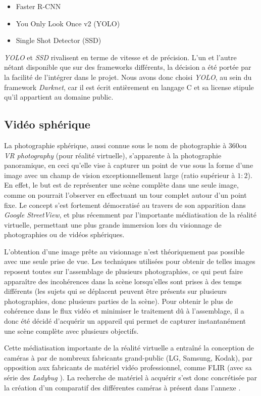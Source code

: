 			\begin{itemize}[noitemsep]
				\item Faster R-CNN\cite{fasterrcnn}
				\item You Only Look Once v2 (YOLO)\cite{yolo}
				\item Single Shot Detector (SSD)\cite{ssd}
			\end{itemize}
			
			\emph{YOLO} et \emph{SSD} rivalisent en terme de vitesse et de précision. L'un et l'autre nétant disponible que sur des frameworks différents, la décision a été portée par la facilité de l'intégrer dans le projet. Nous avons donc choisi \emph{YOLO}, au sein du framework \emph{Darknet}, car il est écrit entièrement en langage C et sa license stipule qu'il appartient au domaine public.
			

		\subsection{Vidéo sphérique}
			La photographie sphérique, aussi connue sous le nom de photographie à 360\degre ou \emph{VR photography} (pour réalité virtuelle), s'apparente à la photographie panoramique, en ceci qu'elle vise à capturer un point de vue sous la forme d'une image avec un champ de vision exceptionnellement large (ratio supérieur à $1:2$)\cite{fnumpano}. En effet, le but est de représenter une scène complète dans une seule image, comme on pourrait l'observer en effectuant un tour complet autour d'un point fixe. Le concept s'est fortement démocratisé au travers de son apparition dans \emph{Google StreetView}, et plus récemment par l'importante médiatisation de la réalité virtuelle, permettant une plus grande immersion lors du visionnage de photographies ou de vidéos sphériques.
			\par
			L'obtention d'une image prête au visionnage n'est théoriquement pas possible avec une seule prise de vue. Les techniques utilisées pour obtenir de telles images reposent toutes sur l'assemblage de plusieurs photographies, ce qui peut faire apparaître des incohérences dans la scène lorsqu'elles sont prises à des temps différents (les sujets qui se déplacent peuvent être présents sur plusieurs photographies, donc plusieurs parties de la scène). Pour obtenir le plus de cohérence dans le flux vidéo et minimiser le traitement dû à l'assemblage, il a donc été décidé d'acquérir un appareil qui permet de capturer instantanément une scène complète avec plusieurs objectifs.
			\par
			Cette médiatisation importante de la réalité virtuelle a entraîné la conception de caméras à \degre par de nombreux fabricants grand-public (LG, Samsung, Kodak), par opposition aux fabricants de matériel vidéo professionnel, comme FLIR (avec sa série des \emph{Ladybug} \cite{ladybug}). La recherche de matériel à acquérir s'est donc concrétisée par la création d'un comparatif des différentes caméras à \degre présent dans l'annexe \todoref.
			
